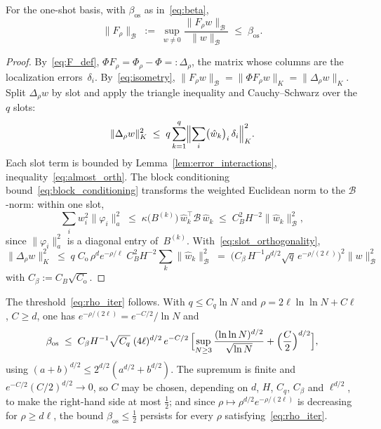 \begin{lemma}\label{lem:F_norm}
For the one-shot basis, with $\beta_{\mathrm{os}}$ as in~\eqref{eq:beta},
\[
  \|F_\rho\|_{\mathcal{B}}
  \;:=\; \sup_{w \neq 0} \frac{\|F_\rho w\|_{\mathcal{B}}}{\|w\|_{\mathcal{B}}}
  \;\leq\; \beta_{\mathrm{os}} .
\]
\end{lemma}

\begin{proof}
By~\eqref{eq:F_def}, $\Phi F_\rho = \Phi_\rho - \Phi =: \Delta_\rho$, the
matrix whose columns are the localization errors~$\delta_i$.
By~\eqref{eq:isometry},
$\|F_\rho w\|_{\mathcal{B}} = \|\Phi F_\rho w\|_K = \|\Delta_\rho w\|_K$.  Split
$\Delta_\rho w$ by slot and apply the triangle inequality and
Cauchy--Schwarz over the $q$ slots:
\[
  \|\Delta_\rho w\|_K^2
  \;\leq\;
  q \sum_{k=1}^{q} \Bigl\|\sum_i \bigl(\hat{w}_k\bigr)_i\,
    \delta_i\Bigr\|_K^2 .
\]
Each slot term is bounded by Lemma~\ref{lem:error_interactions},
inequality~\eqref{eq:almost_orth}.  The block
conditioning bound~\eqref{eq:block_conditioning} transforms the weighted
Euclidean norm to the $\mathcal{B}$-norm: within one slot,
\[
  \sum_i w_i^2 \|\varphi_i\|_a^2
  \;\leq\; \kappa\bigl(B^{(k)}\bigr)\, \hat{w}_k^\top \mathcal{B}\, \hat{w}_k
  \;\leq\; C_B^2 H^{-2} \|\hat{w}_k\|_{\mathcal{B}}^2 ,
\]
since $\|\varphi_i\|_a^2$ is a diagonal entry of~$B^{(k)}$.
With~\eqref{eq:slot_orthogonality},
\[
  \|\Delta_\rho w\|_K^2
  \;\leq\;
  q\; C_{\mathrm{o}}\,\rho^d e^{-\rho/\ell}\; C_B^2 H^{-2}
  \sum_{k} \|\hat{w}_k\|_{\mathcal{B}}^2
  \;=\;
  \bigl(C_\beta\, H^{-1} \rho^{d/2} \sqrt{q}\,
  e^{-\rho/(2\ell)}\bigr)^2 \|w\|_{\mathcal{B}}^2
\]
with $C_\beta := C_B\sqrt{C_{\mathrm{o}}}$.
\end{proof}

The threshold~\eqref{eq:rho_iter} follows.  With $q \leq C_q \ln N$ and
$\rho = 2\ell\ln\ln N + C\ell$, $C \geq d$, one has
$e^{-\rho/(2\ell)} = e^{-C/2}/\ln N$ and
\[
  \beta_{\mathrm{os}}
  \;\leq\; C_\beta H^{-1} \sqrt{C_q}\; (4\ell)^{d/2}\, e^{-C/2}\,
  \Bigl[ \sup_{N \geq 3} \frac{(\ln\ln N)^{d/2}}{\sqrt{\ln N}}
    + \Bigl(\frac{C}{2}\Bigr)^{d/2} \Bigr],
\]
using $(a+b)^{d/2} \leq 2^{d/2}(a^{d/2} + b^{d/2})$.  The supremum is
finite and $e^{-C/2}(C/2)^{d/2} \to 0$, so $C$ may be chosen, depending
on $d$, $H$, $C_q$, $C_\beta$ and $\ell^{d/2}$, to make the right-hand
side at most $\tfrac12$; and since $\rho \mapsto \rho^{d/2}
e^{-\rho/(2\ell)}$ is decreasing for $\rho \geq d\ell$, the bound
$\beta_{\mathrm{os}} \leq \tfrac12$ persists for every $\rho$
satisfying~\eqref{eq:rho_iter}.

